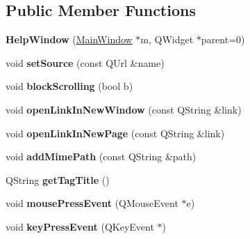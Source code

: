 \subsection*{Public Member Functions}
\begin{DoxyCompactItemize}
\item 
\hypertarget{classHelpWindow_ad985a7a426b238f9e05164d8e28db8bf}{
{\bfseries HelpWindow} (\hyperlink{classMainWindow}{MainWindow} $\ast$m, QWidget $\ast$parent=0)}
\label{classHelpWindow_ad985a7a426b238f9e05164d8e28db8bf}

\item 
\hypertarget{classHelpWindow_af4629af08b03dc40d4d85c01c822a507}{
void {\bfseries setSource} (const QUrl \&name)}
\label{classHelpWindow_af4629af08b03dc40d4d85c01c822a507}

\item 
\hypertarget{classHelpWindow_a8e8257504e8fe9b4d135d46428da0658}{
void {\bfseries blockScrolling} (bool b)}
\label{classHelpWindow_a8e8257504e8fe9b4d135d46428da0658}

\item 
\hypertarget{classHelpWindow_ac4c28b2d4f13881f073533e30f591bb9}{
void {\bfseries openLinkInNewWindow} (const QString \&link)}
\label{classHelpWindow_ac4c28b2d4f13881f073533e30f591bb9}

\item 
\hypertarget{classHelpWindow_ab50dc05cb2b8c1c55ee4e0fc71e1cfa1}{
void {\bfseries openLinkInNewPage} (const QString \&link)}
\label{classHelpWindow_ab50dc05cb2b8c1c55ee4e0fc71e1cfa1}

\item 
\hypertarget{classHelpWindow_a3b40fb93c1e287c9e60d45d28a8a008c}{
void {\bfseries addMimePath} (const QString \&path)}
\label{classHelpWindow_a3b40fb93c1e287c9e60d45d28a8a008c}

\item 
\hypertarget{classHelpWindow_a01f24138eb0aea0713effc944a4c0e4f}{
QString {\bfseries getTagTitle} ()}
\label{classHelpWindow_a01f24138eb0aea0713effc944a4c0e4f}

\item 
\hypertarget{classHelpWindow_a22b93192ca11605cab3a9e072a21ec39}{
void {\bfseries mousePressEvent} (QMouseEvent $\ast$e)}
\label{classHelpWindow_a22b93192ca11605cab3a9e072a21ec39}

\item 
\hypertarget{classHelpWindow_a13061eef6309ac9cb8a77f863952a2e6}{
void {\bfseries keyPressEvent} (QKeyEvent $\ast$)}
\label{classHelpWindow_a13061eef6309ac9cb8a77f863952a2e6}

\end{DoxyCompactItemize}
